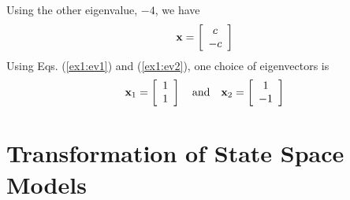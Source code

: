 Using the other eigenvalue, $-4$, we have
\begin{equation}\label{ex1:ev2}
{\bf{x}} = \left[ {\begin{array}{*{20}c}
   c  \\
   -c  \\
\end{array}} \right]
\end{equation}
Using Eqs. (\ref{ex1:ev1}) and (\ref{ex1:ev2}), one choice of eigenvectors is
\begin{equation}\label{ex1:solution}
{\bf{x}}_1  = \left[ {\begin{array}{*{20}c}
   1  \\
   1  \\
\end{array}} \right]\quad {\rm{and}}\quad {\bf{x}}_2  = \left[ {\begin{array}{*{20}c}
   1  \\
   { - 1}  \\
\end{array}} \right]
\end{equation}




\section*{Transformation of State Space Models}



\ifslidesonly
\begin{slide}
   
\end{slide}
\fi


\ifslidesonly
\begin{slide}
   
\end{slide}
\fi


\ifslidesonly
\begin{slide}
   
\end{slide}
\fi

